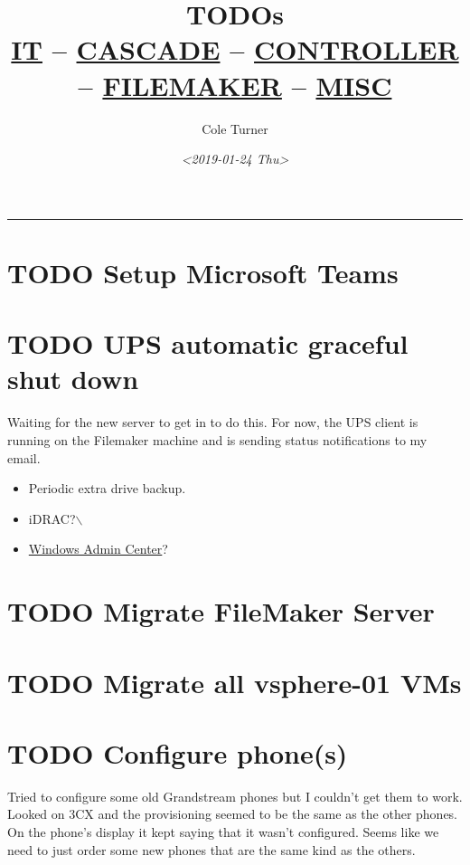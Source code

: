 \documentclass[11pt]{article}
\author{Cole Turner}
\date{\textit{<2019-01-24 Thu>}}
\title{TODOs\\\medskip
\large \href{it.org}{IT} -- \href{cascade.org}{CASCADE} -- \href{controller.org}{CONTROLLER} -- \href{filemaker.org}{FILEMAKER} -- \href{misc.org}{MISC}}
\begin{document}
\maketitle
\tableofcontents


\noindent\rule{\textwidth}{0.5pt}
\section*{{\bfseries\sffamily TODO}  Setup Microsoft Teams}
\label{sec:orgc5c6773}

\section*{{\bfseries\sffamily TODO}  UPS automatic graceful shut down}
\label{sec:org0b5e900}
Waiting for the new server to get in to do this. For now, the UPS client is running on the Filemaker machine and is sending status notifications to my email.\\
\begin{itemize}
\item Periodic extra drive backup.\\
\end{itemize}
\begin{itemize}
\item iDRAC?$\backslash$\\
\item \href{http://aka.ms/WindowsAdminCenter}{Windows Admin Center}?\\
\end{itemize}
\section*{{\bfseries\sffamily TODO}  Migrate FileMaker Server}
\label{sec:org6545001}
\section*{{\bfseries\sffamily TODO}  Migrate all vsphere-01 VMs}
\label{sec:org3ee80ed}
\section*{{\bfseries\sffamily TODO}  Configure phone(s)}
\label{sec:orgc37c745}
Tried to configure some old Grandstream phones but I couldn't get them to work. Looked on 3CX and the provisioning seemed to be the same as the other phones. On the phone's display it kept saying that it wasn't configured. Seems like we need to just order some new phones that are the same kind as the others.\\
\end{document}
